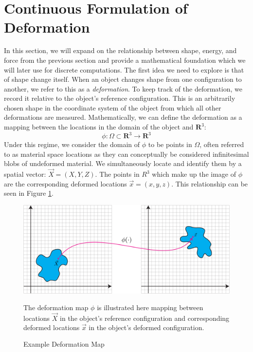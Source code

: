 \section{Continuous Formulation of Deformation}




In this section, we will expand on the relationship between shape,
energy, and force from the previous section and provide a mathematical
foundation which we will later use for discrete computations. The
first idea we need to explore is that of shape change itself. When an
object changes shape from one configuration to another, we refer to
this as a \textit{deformation}. To keep track of the deformation, we
record it relative to the object's reference configuration. This is an arbitrarily
chosen shape in the coordinate system of the object from which all
other deformations are measured. Mathematically, we can define the deformation as
a mapping between the locations in the domain of the object and $\mathbf{R}^3$:
\begin{equation}
  \phi: \Omega \subset \mathbf{R}^3 \rightarrow \mathbf{R}^3
\end{equation}
Under this regime, we consider the domain of $\phi$ to be points in
$\Omega$, often referred to as material space locations as they can
conceptually be considered infinitesimal blobs of undeformed
material. We simultaneously locate and identify them by a spatial
vector: $\vec{X} = (X, Y, Z)$. The points in $R^3$ which make up the
image of $\phi$ are the corresponding deformed locations
$\vec{x} = (x, y, z)$. This relationship can be seen in Figure
\ref{fig:deformationexample}.


\begin{figure}[t]
  \includegraphics[width=\textwidth]{other_images/DeformationFigure.pdf}
   \caption{Example Deformation Map}{The deformation map $\phi$ is
     illustrated here mapping between locations $\vec{X}$ in the
     object's reference configuration and corresponding deformed
     locations $\vec{x}$ in the object's deformed configuration.}
   \label{fig:deformationexample}
\end{figure}

